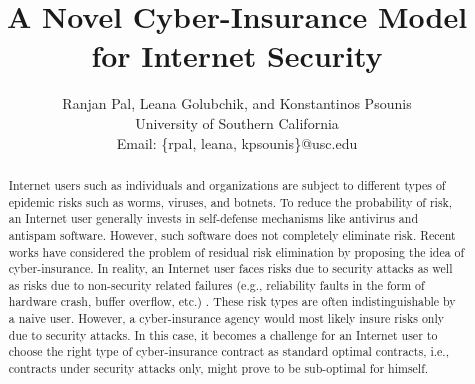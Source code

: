 \documentclass[letterpaper,12pt, onecolumn, nodraft]{IEEEtran}
\begin{document}
\title{A Novel Cyber-Insurance Model for Internet Security}




\author{Ranjan Pal, Leana Golubchik, and Konstantinos Psounis\\University of Southern California\\Email: \{rpal, leana, kpsounis\}@usc.edu}












\maketitle
\begin{abstract}
Internet users such as individuals and organizations are subject to different types of epidemic risks such as worms, viruses, and botnets. To reduce the probability of risk, an Internet user generally invests in self-defense mechanisms like antivirus and antispam software. However, such software does not completely eliminate risk. Recent works have considered the problem of residual risk elimination by proposing the idea of cyber-insurance. In reality, an Internet user faces risks due to security attacks as well as risks due to non-security related failures (e.g., reliability faults in the form of hardware crash, buffer overflow, etc.) . These risk types are often indistinguishable by a naive user. However, a cyber-insurance agency would most likely insure risks only due to security attacks. In this case, it becomes a challenge for an Internet user to choose the right type of cyber-insurance contract as standard optimal contracts, i.e., contracts under security attacks only, might prove to be sub-optimal for himself.


\end{abstract}
\end{document}
